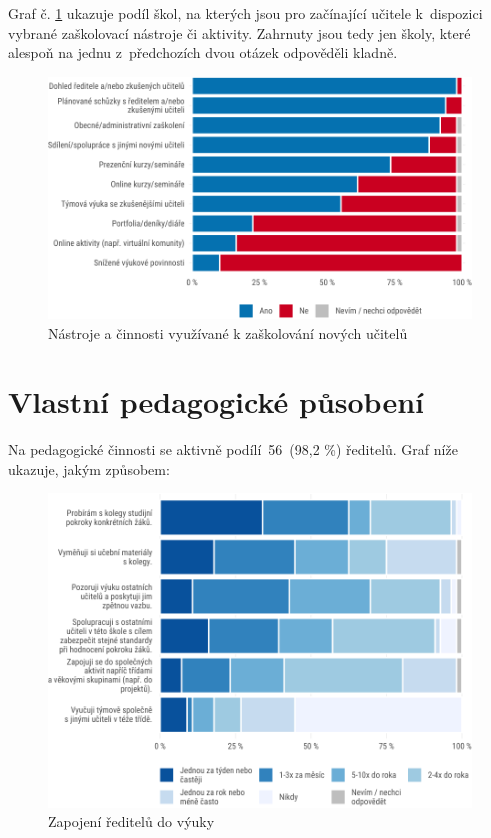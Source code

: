 \documentclass[12pt,a4paper,]{report}
\begin{document}
Graf č. \ref{fig:activities} ukazuje podíl škol, na kterých jsou pro začínající učitele k~dispozici vybrané zaškolovací nástroje či aktivity. Zahrnuty jsou tedy jen školy, které alespoň na jednu z~předchozích dvou otázek odpověděli kladně.

\begin{figure}

{\centering \includegraphics[width=\textwidth]{figs/activities-1} 

}

\caption{Nástroje a činnosti využívané k zaškolování nových učitelů}\label{fig:activities}
\end{figure}

\newpage

\hypertarget{vlastnuxed-pedagogickuxe9-pux16fsobenuxed}{%
\section{Vlastní pedagogické působení}\label{vlastnuxed-pedagogickuxe9-pux16fsobenuxed}}

Na pedagogické činnosti se aktivně podílí~56~(98,2 \%) ředitelů. Graf níže ukazuje, jakým způsobem:

\begin{figure}

{\centering \includegraphics[width=\textwidth]{figs/teachPartic-1} 

}

\caption{Zapojení ředitelů do výuky}\label{fig:teachPartic}
\end{figure}
\end{document}
